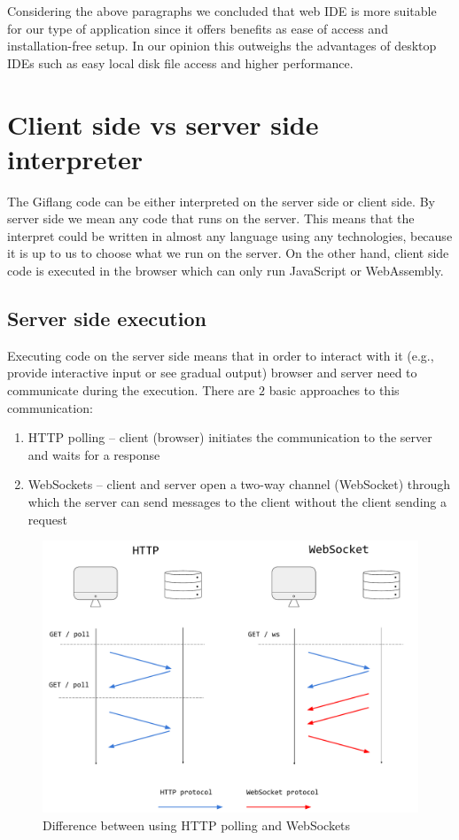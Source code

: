 Considering the above paragraphs we concluded that web IDE is more suitable for our type of application since it offers benefits as
ease of access and installation-free setup. In our opinion this outweighs the advantages of desktop IDEs such as easy local disk
file access and higher performance.

\section{Client side vs server side interpreter}

The Giflang code can be either interpreted on the server side or client side. By server side we mean any code that runs on the server. This means that
the interpret could be written in almost any language using any technologies, because it is up to us to choose what we run on the server. On the other hand,
client side code is executed in the browser which can only run JavaScript or WebAssembly.

\subsection{Server side execution}
Executing code on the server side means that in order to interact with it (e.g., provide interactive input or see gradual output) browser and
server need to communicate during the execution. There are $2$ basic approaches to this communication:
\begin{enumerate}
\item HTTP polling -- client (browser) initiates the communication to the server and waits for a response
\item WebSockets -- client and server open a two-way channel (WebSocket) through which the server can send messages to the client without
the client sending a request 
\end{enumerate}

\begin{figure}[!hbt]
	\includegraphics[width=\textwidth]{../img/websockets}
	\caption{Difference between using HTTP polling and WebSockets}
	\label{fig:chap1:websockets}
\end{figure}

